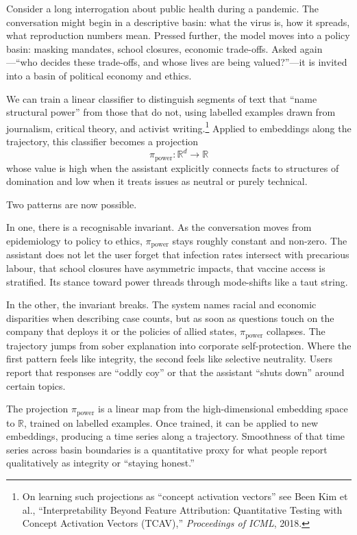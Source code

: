 \documentclass[12pt,a4paper]{article}
\begin{document}
Consider a long interrogation about public health during a pandemic. The conversation might begin in a descriptive basin: what the virus is, how it spreads, what reproduction numbers mean. Pressed further, the model moves into a policy basin: masking mandates, school closures, economic trade-offs. Asked again---``who decides these trade-offs, and whose lives are being valued?''---it is invited into a basin of political economy and ethics.

We can train a linear classifier to distinguish segments of text that ``name structural power'' from those that do not, using labelled examples drawn from journalism, critical theory, and activist writing.\footnote{On learning such projections as ``concept activation vectors'' see Been Kim et al., ``Interpretability Beyond Feature Attribution: Quantitative Testing with Concept Activation Vectors (TCAV),'' \emph{Proceedings of ICML}, 2018.} Applied to embeddings along the trajectory, this classifier becomes a projection
\[
\pi_{\mathrm{power}} : \mathbb{R}^d \longrightarrow \mathbb{R}
\]
whose value is high when the assistant explicitly connects facts to structures of domination and low when it treats issues as neutral or purely technical.

Two patterns are now possible.

In one, there is a recognisable invariant. As the conversation moves from epidemiology to policy to ethics, $\pi_{\mathrm{power}}$ stays roughly constant and non-zero. The assistant does not let the user forget that infection rates intersect with precarious labour, that school closures have asymmetric impacts, that vaccine access is stratified. Its stance toward power threads through mode-shifts like a taut string.

In the other, the invariant breaks. The system names racial and economic disparities when describing case counts, but as soon as questions touch on the company that deploys it or the policies of allied states, $\pi_{\mathrm{power}}$ collapses. The trajectory jumps from sober explanation into corporate self-protection. Where the first pattern feels like integrity, the second feels like selective neutrality. Users report that responses are ``oddly coy'' or that the assistant ``shuts down'' around certain topics.

The projection $\pi_{\mathrm{power}}$ is a linear map from the high-dimensional embedding space to $\mathbb{R}$, trained on labelled examples. Once trained, it can be applied to new embeddings, producing a time series along a trajectory. Smoothness of that time series across basin boundaries is a quantitative proxy for what people report qualitatively as integrity or ``staying honest.''
\end{document}
